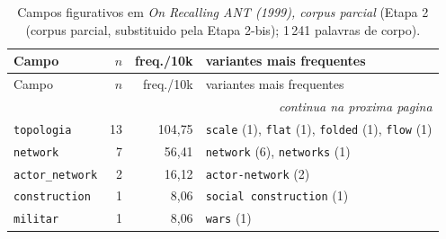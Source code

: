{\footnotesize
\begin{longtable}{@{}l r r >{\raggedright\arraybackslash}p{6.4cm}@{}}
\caption{Campos figurativos em \emph{On Recalling ANT (1999), corpus parcial} (Etapa 2 (corpus parcial, substituido pela Etapa 2-bis); 1\,241 palavras de corpo).}\label{tab:campos-rec99p}\\
\toprule
Campo & $n$ & freq./10k & variantes mais frequentes \\
\midrule \endfirsthead
\toprule Campo & $n$ & freq./10k & variantes mais frequentes \\ \midrule \endhead
\midrule \multicolumn{4}{r}{\footnotesize \emph{continua na proxima pagina}}\\ \endfoot
\bottomrule \endlastfoot
\texttt{topologia} & 13 & 104{,}75 & \texttt{scale} (1), \texttt{flat} (1), \texttt{folded} (1), \texttt{flow} (1) \\
\texttt{network} & 7 & 56{,}41 & \texttt{network} (6), \texttt{networks} (1) \\
\texttt{actor\_network} & 2 & 16{,}12 & \texttt{actor-network} (2) \\
\texttt{construction} & 1 & 8{,}06 & \texttt{social construction} (1) \\
\texttt{militar} & 1 & 8{,}06 & \texttt{wars} (1) \\
\end{longtable}}

